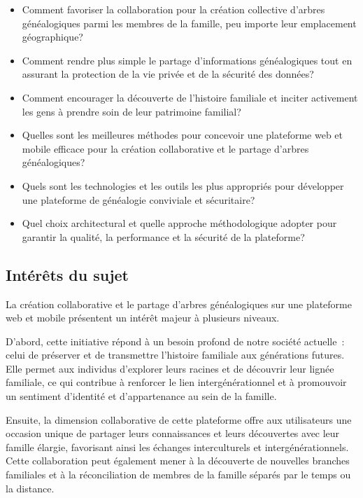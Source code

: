 \begin{itemize}
  \item Comment favoriser la collaboration pour la création collective d’arbres
    généalogiques parmi les membres de la famille, peu importe leur
    emplacement géographique?

  \item Comment rendre plus simple le partage d’informations généalogiques tout
    en assurant la protection de la vie privée et de la sécurité des données?

  \item Comment encourager la découverte de l’histoire familiale et inciter
    activement les gens à prendre soin de leur patrimoine familial?

  \item  Quelles sont les meilleures méthodes pour concevoir une plateforme web
    et mobile efficace pour la création collaborative et le partage d’arbres
    généalogiques?

  \item Quels sont les technologies et les outils les plus appropriés pour
    développer une plateforme de généalogie conviviale et sécuritaire?

  \item Quel choix architectural et quelle approche méthodologique adopter pour
    garantir la qualité, la performance et la sécurité de la plateforme?

\end{itemize}

\subsection{Intérêts du sujet}
La création collaborative et le partage d’arbres généalogiques sur une plateforme
web et mobile présentent un intérêt majeur à plusieurs niveaux.

D'abord, cette initiative répond à un besoin profond de notre société actuelle :
celui de préserver et de transmettre l’histoire familiale aux générations futures.
Elle permet aux individus d’explorer leurs racines et de découvrir leur lignée
familiale, ce qui contribue à renforcer le lien intergénérationnel et à promouvoir
un sentiment d’identité et d’appartenance au sein de la famille.

Ensuite, la dimension collaborative de cette plateforme offre aux utilisateurs une
occasion unique de partager leurs connaissances et leurs découvertes avec leur famille
élargie, favorisant ainsi les échanges interculturels et intergénérationnels.
Cette collaboration peut également mener à la découverte de nouvelles branches
familiales et à la réconciliation de membres de la famille séparés par le temps ou la distance.

